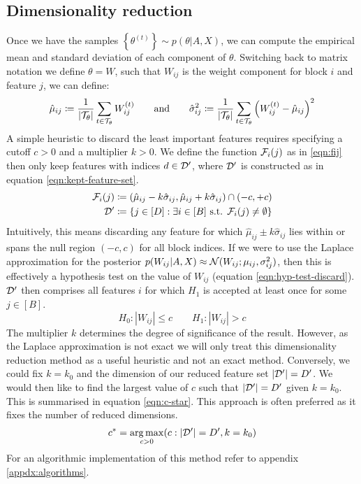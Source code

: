 \subsection{Dimensionality reduction}
\label{sec:dim-reduction}

Once we have the samples $\left\{ \theta^{(t)} \right\} \sim p(\theta | A, X)$, we can compute the empirical mean and standard deviation of each component of $\theta$. Switching back to matrix notation we define $\theta = W$, such that $W_{ij}$ is the weight component for block $i$ and feature $j$, we can define:
%
\begin{equation}
	\hat{\mu}_{ij} \coloneqq \frac{1}{|\mathcal{T}_\theta|} \sum_{t \in \mathcal{T}_\theta} W_{ij}^{(t)} \qquad \textrm{and} \qquad
	\hat{\sigma}_{ij}^2 \coloneqq \frac{1}{|\mathcal{T}_\theta|} \sum_{t \in \mathcal{T}_\theta} \left( W_{ij}^{(t)} - \hat{\mu}_{ij} \right)^2
\end{equation}
%
A simple heuristic to discard the least important features requires specifying a cutoff $c > 0$ and a multiplier $k > 0$. We define the function $\mathcal{F}_i(j)$ as in \ref{eqn:fij} then only keep features with indices $d \in \mathcal{D}'$, where $\mathcal{D}'$ is constructed as in equation \ref{eqn:kept-feature-set}.
%
\begin{align}
	\mathcal{F}_i(j) &\coloneqq (\hat{\mu}_{ij} - k \hat{\sigma}_{ij}, \hat{\mu}_{ij} + k \hat{\sigma}_{ij}) \cap (-c, +c)
	\label{eqn:fij} \\
	\mathcal{D}' &\coloneqq \left\{ j \in [D] : \exists i \in [B] \textrm{ s.t. }  \mathcal{F}_i(j) \neq \emptyset \right\}
	\label{eqn:kept-feature-set}
\end{align}
%
Intuitively, this means discarding any feature for which $\hat{\mu}_{ij} \pm k\hat{\sigma}_{ij}$ lies within or spans the null region $(-c, c)$ for all block indices. If we were to use the Laplace approximation for the posterior $p(W_{ij} | A, X) \approx \mathcal{N}(W_{ij}; \mu_{ij}, \sigma_{ij}^2)$, then this is effectively a hypothesis test on the value of $W_{ij}$ (equation \ref{eqn:hyp-test-discard}). $\mathcal{D}'$ then comprises all features $i$ for which $H_1$ is accepted at least once for some $j \in [B]$.
%
\begin{equation}
	H_0: |W_{ij}| \leq c \qquad
	H_1: |W_{ij}| > c
	\label{eqn:hyp-test-discard}
\end{equation}
%
The multiplier $k$ determines the degree of significance of the result. However, as the Laplace approximation is not exact we will only treat this dimensionality reduction method as a useful heuristic and not an exact method. Conversely, we could fix $k=k_0$ and the dimension of our reduced feature set $|\mathcal{D}'|=D'$. We would then like to find the largest value of $c$ such that $|\mathcal{D}'|=D'$ given $k=k_0$. This is summarised in equation \ref{eqn:c-star}. This approach is often preferred as it fixes the number of reduced dimensions.
%
\begin{equation}
	c^* = \operatorname*{arg\,max}_{c>0} (c : |\mathcal{D}'| = D', k=k_0)
	\label{eqn:c-star}
\end{equation}
%
For an algorithmic implementation of this method refer to appendix \ref{appdx:algorithms}.